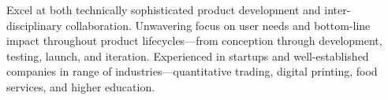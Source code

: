 

\begin{cvparagraph}

Excel at both technically sophisticated product development and inter-disciplinary
collaboration. Unwavering focus on user needs and bottom-line impact throughout
product lifecycles—from conception through development, testing, launch, and
iteration. Experienced in startups and well-established companies in range of
industries—quantitative trading, digital printing, food services, and higher
education.
\end{cvparagraph}
